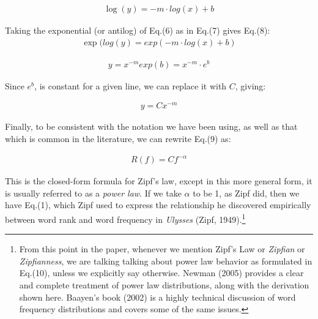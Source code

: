 \documentclass[12pt]{article}
\begin{document}
\begin{align}
\log(y) = -m \cdot log(x) + b
\end{align}

\noindent Taking the exponential (or antilog) of Eq.(6) as in Eq.(7) gives Eq.(8):
\begin{align}
\exp(log(y) = exp(-m \cdot log(x) + b)
\end{align}

\begin{align}
y = x^{-m}exp(b) = x^{-m} \cdot e^b
\end{align}

Since $e^b$, is constant for a given line, we can replace it with $C$, giving:

\begin{align}
y = Cx^{-m}
\end{align}

\noindent Finally, to be consistent with the notation we have been using, as well as that which is common in the literature, we can rewrite Eq.(9) as:


\begin{align}
R(f) = Cf^{-\alpha}
\end{align}



\noindent This is the closed-form formula for Zipf's law, except in this more general form, it is usually referred to as a \emph{power law}.  If we take $\alpha$ to be 1, as Zipf did, then we have Eq.(1), which Zipf used to express the relationship he discovered empirically between word rank and word frequency in \emph{Ulysses} (Zipf, 1949).\footnote[6]{From this point in the paper, whenever we mention Zipf's Law or \emph{Zipfian} or \emph{Zipfianness}, we are talking talking about power law behavior as formulated in Eq.(10), unless we explicitly say otherwise. Newman (2005) provides a clear and complete treatment of power law distributions, along with the derivation shown here.  Baayen's book (2002) is a highly technical discussion of word frequency distributions and covers some of the same issues.}
\end{document}
